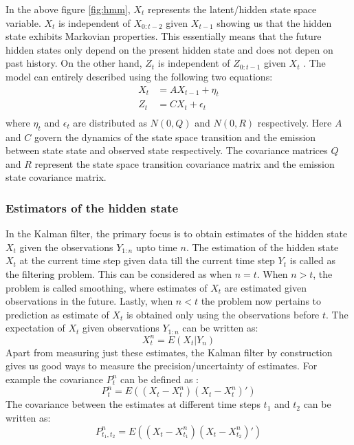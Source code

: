 \documentclass{article}
\begin{document}
In the above figure \ref{fig:hmm}, $X_t$ represents the latent/hidden state space variable. $X_t$ is independent of $X_{0:t-2}$ given $X_{t-1}$ showing us that the hidden state  exhibits Markovian properties. This essentially means that the future hidden states only depend on the present hidden state and does not depen on past history. On the other hand, $Z_t$ is independent of $Z_{0:t-1}$ given $X_{t}$ . The model can entirely described using the following two equations:
\begin{equation}\label{eq:1}
\begin{split}
    X_{t}&=AX_{t-1} + \eta_t\\
    Z_{t}&=CX_{t}+\epsilon_t\\
\end{split}
\end{equation}
where $\eta_t$ and $\epsilon_t$ are distributed as $N(0,Q)$ and $N(0,R)$ respectively.  Here $A$ and $C$ govern the dynamics of the state space transition and the emission between state state and observed state respectively. The covariance matrices $Q$ and $R$ represent the state space transition covariance matrix and the emission state covariance matrix.


\subsubsection{Estimators of the hidden state}

In the Kalman filter, the primary focus is to obtain estimates of the hidden state $X_{t}$ given the observations $Y_{1:n}$ upto time $n$. The estimation of the hidden state $X_t$ at the current time step given data till the current time step $Y_t$  is called as the filtering problem. This can be considered as when $n=t$.  When $n>t$, the problem is called smoothing, where estimates of $X_t$ are estimated given observations in the future. Lastly, when $n<t$ the problem now pertains to prediction as estimate of $X_t$ is obtained only using the observations before $t$. The expectation of $X_t$ given observations $Y_{1:n}$ can be written as: 
\begin{equation} \label{eq:2}
  X_{t}^n=E(X_t | Y_n)  
\end{equation}
Apart from measuring just these estimates, the Kalman filter by construction gives us good ways to measure the precision/uncertainty of estimates. For example the covariance $P_{t}^n$ can be defined as :
\begin{equation} \label{eq:3}
  P_t^{n} = E((X_t-X_t^n)(X_t-X_t^n)')  
\end{equation}
The covariance between the estimates at different time steps $t_1$ and $t_2$ can be written as:
\begin{equation} \label{eq:4}
  P_{t_1,t_2}^{n} = E((X_t-X_{t_1}^{n})(X_t-X_{t_2}^{n})')  
\end{equation}
\end{document}
